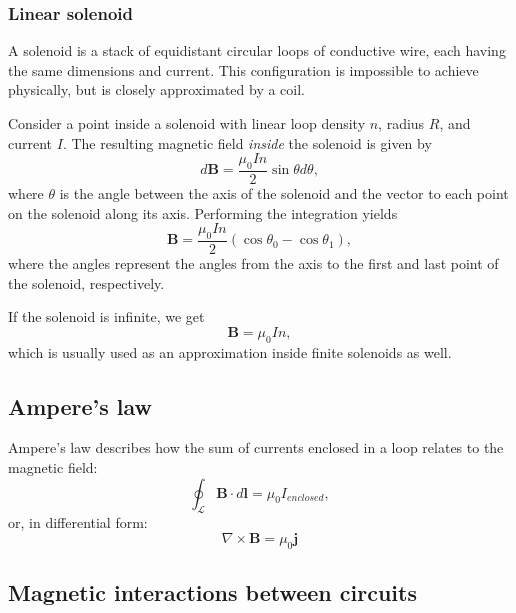 \documentclass[a4paper, 12pt]{article}
\renewcommand{\vec}[1]{\mathbf{#1}}
\renewcommand{\j}{\ensuremath{\vec{j}}}
\newcommand{\B}{\ensuremath{\vec{B}}}
\begin{document}
        \subsubsection{Linear solenoid}
            A solenoid is a stack of equidistant circular loops of conductive wire, each having the same dimensions and current. 
            This configuration is impossible to achieve physically, but is closely approximated by a coil. 

            Consider a point inside a solenoid with linear loop density $n$, radius $R$, and current $I$. 
            The resulting magnetic field \textit{inside} the solenoid is given by
            \begin{equation}
                d\B = \frac{\mu_0 I n}{2}\sin\theta d\theta,
            \end{equation}
            where $\theta$ is the angle between the axis of the solenoid and the vector to each point on the solenoid along its axis.
            Performing the integration yields
            \begin{equation}
                \B = \frac{\mu_0 In}{2}\left(\cos\theta_0 - \cos\theta_1\right),
            \end{equation}
            where the angles represent the angles from the axis to the first and last point of the solenoid, respectively. 

            If the solenoid is infinite, we get
            \begin{equation}
                \B = \mu_0 In,
            \end{equation}
            which is usually used as an approximation inside finite solenoids as well.
    
    \subsection{Ampere's law}
        Ampere's law describes how the sum of currents enclosed in a loop relates to the magnetic field: 
        \begin{equation}
            \oint_\mathcal{L}\B\cdot d\vec{l} = \mu_0 I_{enclosed},
        \end{equation}
        or, in differential form: 
        \begin{equation}
            \nabla\times\B = \mu_0\j
        \end{equation}
    
    \subsection{Magnetic interactions between circuits}
\end{document}

